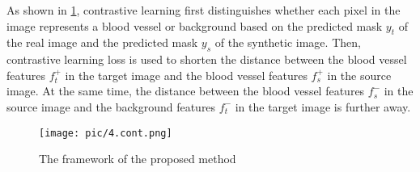 As shown in \cref{fig:Contrastive}, contrastive learning first distinguishes whether each pixel in the image represents a blood vessel or background based on the predicted mask $y_t$ of the real image and the predicted mask $y_s$ of the synthetic image. Then, contrastive learning loss is used to shorten the distance between the blood vessel features $f_t^+$ in the target image and the blood vessel features $f_s^+$ in the source image. At the same time, the distance between the blood vessel features $f_s^-$ in the source image and the background features $f_t^-$ in the target image is further away.

\begin{figure}[htbp]
  \centering
  \texttt{[image: pic/4.cont.png]}
  \caption{The framework of the proposed method}
  \label{fig:Contrastive}
\end{figure}

